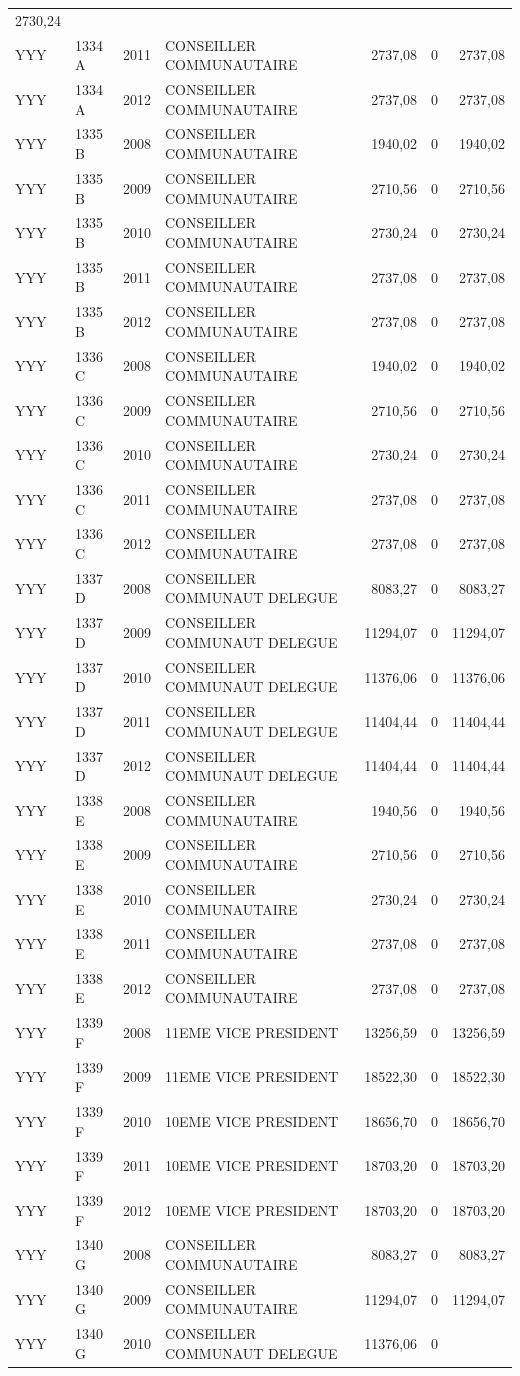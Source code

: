 \begin{longtable}[]{@{}llrlrrr@{}}
2730,24\tabularnewline
YYY & 1334 A & 2011 & CONSEILLER COMMUNAUTAIRE & 2737,08 & 0 &
2737,08\tabularnewline
YYY & 1334 A & 2012 & CONSEILLER COMMUNAUTAIRE & 2737,08 & 0 &
2737,08\tabularnewline
YYY & 1335 B & 2008 & CONSEILLER COMMUNAUTAIRE & 1940,02 & 0 &
1940,02\tabularnewline
YYY & 1335 B & 2009 & CONSEILLER COMMUNAUTAIRE & 2710,56 & 0 &
2710,56\tabularnewline
YYY & 1335 B & 2010 & CONSEILLER COMMUNAUTAIRE & 2730,24 & 0 &
2730,24\tabularnewline
YYY & 1335 B & 2011 & CONSEILLER COMMUNAUTAIRE & 2737,08 & 0 &
2737,08\tabularnewline
YYY & 1335 B & 2012 & CONSEILLER COMMUNAUTAIRE & 2737,08 & 0 &
2737,08\tabularnewline
YYY & 1336 C & 2008 & CONSEILLER COMMUNAUTAIRE & 1940,02 & 0 &
1940,02\tabularnewline
YYY & 1336 C & 2009 & CONSEILLER COMMUNAUTAIRE & 2710,56 & 0 &
2710,56\tabularnewline
YYY & 1336 C & 2010 & CONSEILLER COMMUNAUTAIRE & 2730,24 & 0 &
2730,24\tabularnewline
YYY & 1336 C & 2011 & CONSEILLER COMMUNAUTAIRE & 2737,08 & 0 &
2737,08\tabularnewline
YYY & 1336 C & 2012 & CONSEILLER COMMUNAUTAIRE & 2737,08 & 0 &
2737,08\tabularnewline
YYY & 1337 D & 2008 & CONSEILLER COMMUNAUT DELEGUE & 8083,27 & 0 &
8083,27\tabularnewline
YYY & 1337 D & 2009 & CONSEILLER COMMUNAUT DELEGUE & 11294,07 & 0 &
11294,07\tabularnewline
YYY & 1337 D & 2010 & CONSEILLER COMMUNAUT DELEGUE & 11376,06 & 0 &
11376,06\tabularnewline
YYY & 1337 D & 2011 & CONSEILLER COMMUNAUT DELEGUE & 11404,44 & 0 &
11404,44\tabularnewline
YYY & 1337 D & 2012 & CONSEILLER COMMUNAUT DELEGUE & 11404,44 & 0 &
11404,44\tabularnewline
YYY & 1338 E & 2008 & CONSEILLER COMMUNAUTAIRE & 1940,56 & 0 &
1940,56\tabularnewline
YYY & 1338 E & 2009 & CONSEILLER COMMUNAUTAIRE & 2710,56 & 0 &
2710,56\tabularnewline
YYY & 1338 E & 2010 & CONSEILLER COMMUNAUTAIRE & 2730,24 & 0 &
2730,24\tabularnewline
YYY & 1338 E & 2011 & CONSEILLER COMMUNAUTAIRE & 2737,08 & 0 &
2737,08\tabularnewline
YYY & 1338 E & 2012 & CONSEILLER COMMUNAUTAIRE & 2737,08 & 0 &
2737,08\tabularnewline
YYY & 1339 F & 2008 & 11EME VICE PRESIDENT & 13256,59 & 0 &
13256,59\tabularnewline
YYY & 1339 F & 2009 & 11EME VICE PRESIDENT & 18522,30 & 0 &
18522,30\tabularnewline
YYY & 1339 F & 2010 & 10EME VICE PRESIDENT & 18656,70 & 0 &
18656,70\tabularnewline
YYY & 1339 F & 2011 & 10EME VICE PRESIDENT & 18703,20 & 0 &
18703,20\tabularnewline
YYY & 1339 F & 2012 & 10EME VICE PRESIDENT & 18703,20 & 0 &
18703,20\tabularnewline
YYY & 1340 G & 2008 & CONSEILLER COMMUNAUTAIRE & 8083,27 & 0 &
8083,27\tabularnewline
YYY & 1340 G & 2009 & CONSEILLER COMMUNAUTAIRE & 11294,07 & 0 &
11294,07\tabularnewline
YYY & 1340 G & 2010 & CONSEILLER COMMUNAUT DELEGUE & 11376,06 & 0 &

\end{longtable}
